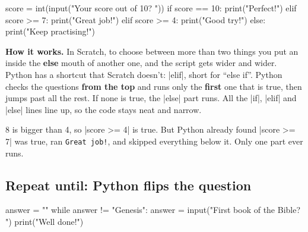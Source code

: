 \begin{center}
\begin{scratch}
\end{scratch}
\end{center}
\vspace{-4pt}
\begin{code}
score = int(input("Your score out of 10? "))
if score == 10:
    print("Perfect!")
elif score >= 7:
    print("Great job!")
elif score >= 4:
    print("Good try!")
else:
    print("Keep practising!")
\end{code}

\textbf{How it works.} In Scratch, to choose between more than two things you put an  inside the \textbf{else} mouth of another one, and the script gets wider and wider. Python has a shortcut that Scratch doesn't: \py|elif|, short for ``else if''. Python checks the questions \textbf{from the top} and runs only the \textbf{first} one that is true, then jumps past all the rest. If none is true, the \py|else| part runs. All the \py|if|, \py|elif| and \py|else| lines line up, so the code stays neat and narrow.

\begin{think}
8 is bigger than 4, so \py|score >= 4| is true. But Python already found \py|score >= 7| was true, ran \texttt{Great job!}, and skipped everything below it. Only one part ever runs.
\end{think}

\subsection*{Repeat until: Python flips the question}

\begin{tcbraster}[raster columns=1, raster row skip=6pt]
\begin{tcolorbox}[colback=white, colframe=white, boxrule=0pt, valign=center, left=0pt, right=0pt]
\begin{scratch}
\end{scratch}
\end{tcolorbox}
\begin{code}
answer = ""
while answer != "Genesis":
    answer = input("First book of the Bible? ")
print("Well done!")
\end{code}
\end{tcbraster}

